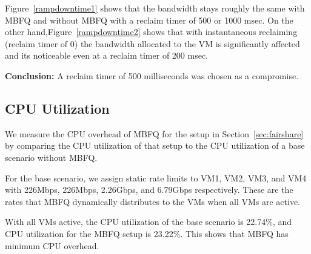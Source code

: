 Figure~\ref{rampdowntime1} shows that the bandwidth stays roughly the same with
MBFQ and without MBFQ with a reclaim timer of 500 or 1000 msec. On the other
hand,Figure~\ref{rampdowntime2} shows that with instantaneous reclaiming
(reclaim timer of 0) the bandwidth allocated to the VM is significantly affected
and its noticeable even at a reclaim timer of 200 msec.

{\bf Conclusion:}  A reclaim timer of 500 milliseconds was chosen as a 
compromise. 

\subsection{CPU Utilization}
\label{sec:utilization}

We measure the CPU overhead of MBFQ for the setup in Section~\ref{sec:fairshare}
by comparing the CPU utilization of that setup to the CPU utilization of a base scenario
without MBFQ.  

For the base scenario, we assign static rate limits to VM1, VM2, VM3, and VM4 with 
226Mbps, 226Mbps, 2.26Gbps, 
and 6.79Gbps respectively.  These are the rates that MBFQ dynamically distributes  to
the VMs when all VMs are active.

With all VMs active, the CPU utilization of the base scenario is 22.74\%, and CPU utilization
for the MBFQ setup is 23.22\%. This shows that MBFQ has minimum CPU overhead.
